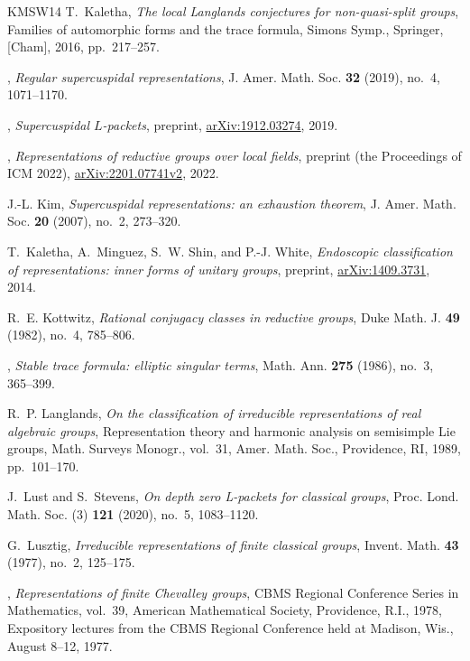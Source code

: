 \documentclass{amsart}
\theoremstyle{plain}
\theoremstyle{definition}
\theoremstyle{remark}
\theoremstyle{theorem}
\begin{document}
\begin{thebibliography}{KMSW14}
T.~Kaletha, \emph{The local {L}anglands conjectures for non-quasi-split
  groups}, Families of automorphic forms and the trace formula, Simons Symp.,
  Springer, [Cham], 2016, pp.~217--257.

\bysame, \emph{Regular supercuspidal representations}, J. Amer. Math. Soc.
  \textbf{32} (2019), no.~4, 1071--1170.

\bysame, \emph{Supercuspidal {$L$}-packets}, preprint, \url{arXiv:1912.03274},
  2019.

\bysame, \emph{Representations of reductive groups over local fields}, preprint
  (the Proceedings of ICM 2022), \url{arXiv:2201.07741v2}, 2022.

J.-L. Kim, \emph{Supercuspidal representations: an exhaustion theorem}, J.
  Amer. Math. Soc. \textbf{20} (2007), no.~2, 273--320.

T.~Kaletha, A.~Minguez, S.~W. Shin, and P.-J. White, \emph{Endoscopic
  classification of representations: inner forms of unitary groups}, preprint,
  \url{arXiv:1409.3731}, 2014.

R.~E. Kottwitz, \emph{Rational conjugacy classes in reductive groups}, Duke
  Math. J. \textbf{49} (1982), no.~4, 785--806.

\bysame, \emph{Stable trace formula: elliptic singular terms}, Math. Ann.
  \textbf{275} (1986), no.~3, 365--399.

R.~P. Langlands, \emph{On the classification of irreducible representations of
  real algebraic groups}, Representation theory and harmonic analysis on
  semisimple {L}ie groups, Math. Surveys Monogr., vol.~31, Amer. Math. Soc.,
  Providence, RI, 1989, pp.~101--170.

J.~Lust and S.~Stevens, \emph{On depth zero {L}-packets for classical groups},
  Proc. Lond. Math. Soc. (3) \textbf{121} (2020), no.~5, 1083--1120.

G.~Lusztig, \emph{Irreducible representations of finite classical groups},
  Invent. Math. \textbf{43} (1977), no.~2, 125--175.

\bysame, \emph{Representations of finite {C}hevalley groups}, CBMS Regional
  Conference Series in Mathematics, vol.~39, American Mathematical Society,
  Providence, R.I., 1978, Expository lectures from the CBMS Regional Conference
  held at Madison, Wis., August 8--12, 1977.


\end{thebibliography}
\end{document}
